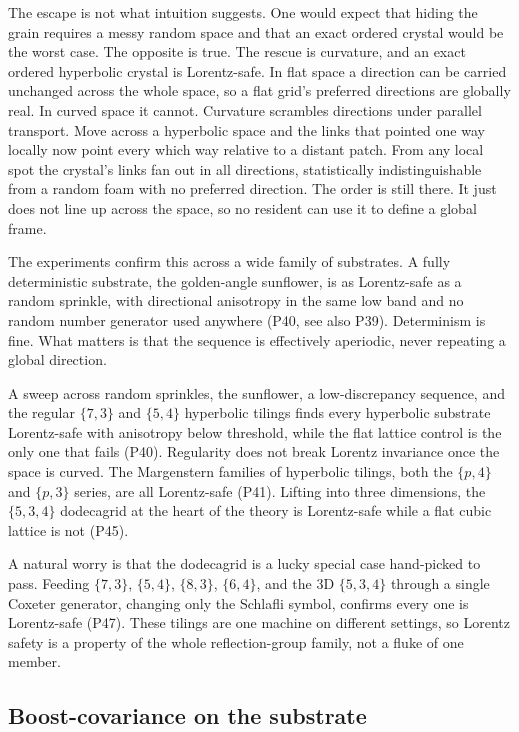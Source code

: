 The escape is not what intuition suggests. One would expect that hiding the grain requires a messy random
space and that an exact ordered crystal would be the worst case. The opposite is true. The rescue is
curvature, and an exact ordered hyperbolic crystal is Lorentz-safe. In flat space a direction can be carried
unchanged across the whole space, so a flat grid's preferred directions are globally real. In curved space it
cannot. Curvature scrambles directions under parallel transport. Move across a hyperbolic space and the links
that pointed one way locally now point every which way relative to a distant patch. From any local spot the
crystal's links fan out in all directions, statistically indistinguishable from a random foam with no
preferred direction. The order is still there. It just does not line up across the space, so no resident can
use it to define a global frame.

The experiments confirm this across a wide family of substrates. A fully deterministic substrate, the
golden-angle sunflower, is as Lorentz-safe as a random sprinkle, with directional anisotropy in the same low
band and no random number generator used anywhere (P40, see also P39). Determinism is fine. What matters is
that the sequence is effectively aperiodic, never repeating a global direction.

A sweep across random
sprinkles, the sunflower, a low-discrepancy sequence, and the regular $\{7,3\}$ and $\{5,4\}$ hyperbolic
tilings finds every hyperbolic substrate Lorentz-safe with anisotropy below threshold, while the flat lattice
control is the only one that fails (P40). Regularity does not break Lorentz invariance once the space is
curved. The Margenstern families of hyperbolic tilings, both the $\{p,4\}$ and $\{p,3\}$ series, are all
Lorentz-safe (P41). Lifting into three dimensions, the $\{5,3,4\}$ dodecagrid at the heart of the theory is
Lorentz-safe while a flat cubic lattice is not (P45).

A natural worry is that the dodecagrid is a lucky
special case hand-picked to pass. Feeding $\{7,3\}$, $\{5,4\}$, $\{8,3\}$, $\{6,4\}$, and the 3D $\{5,3,4\}$
through a single Coxeter generator, changing only the Schlafli symbol, confirms every one is Lorentz-safe
(P47). These tilings are one machine on different settings, so Lorentz safety is a property of the whole
reflection-group family, not a fluke of one member.

\subsection{Boost-covariance on the substrate}

